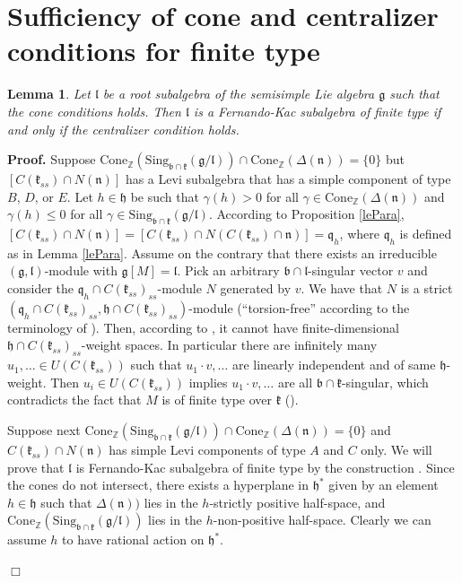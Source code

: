 \documentclass[12pt]{report}
\newtheorem{lemma}[theo]{Lemma}
\newenvironment{proof}[1][]{ \textbf{Proof#1. }}{$\Box$\medskip}
\newcommand {\ZZ} {\mathbb {Z}}
\newcommand{\kk}{\mathfrak{k}}
\newcommand{\nn}{\mathfrak{n}}
\newcommand{\hh}{\mathfrak{h}}
\newcommand{\qq}{\mathfrak{q}}
\newcommand{\pp}{\mathfrak{p}}
\newcommand{\gG}{\mathfrak{g}}
\newcommand{\bb}{\mathfrak{b}}
\newcommand{\lL}{\mathfrak{l}}
\newcommand{\refle}[1]{Lemma \ref{#1}}
\newcommand{\Cone}{\mathrm{Cone}}
\newcommand{\hw}{\mathrm{Sing}}
\begin{document}
\section{Sufficiency of cone and centralizer conditions for finite type}
\begin{lemma}
Let $\lL$ be a root subalgebra of the semisimple Lie algebra $\gG$ such that the cone conditions holds. Then $\lL$ is a Fernando-Kac subalgebra of finite type if and only if the centralizer condition holds.
\end{lemma}
\begin{proof}
Suppose $\Cone_{\ZZ} (\hw_{\bb\cap\kk}(\gG/\lL))\cap \Cone_{\ZZ}(\Delta(\nn))= \{0\}$ but $[C(\kk_{ss})\cap N(\nn)]$ has a Levi subalgebra that has a simple component of type $B$, $D$, or $E$. Let $h\in\hh$ be such that $\gamma(h)>0$ for all $\gamma \in \Cone_{\ZZ}(\Delta(\nn))$ and $\gamma(h)\leq 0$ for all $\gamma\in\hw_{\bb\cap\kk}(\gG/\lL)$. According to Proposition \ref{lePara}, $[C(\kk_{ss}) \cap N(\nn)] =[C(\kk_{ss})\cap N(C(\kk_{ss})\cap\nn)]=\qq_h$, where $\qq_h$ is defined as in \refle{lePara}. Assume on the contrary that there exists an irreducible $(\gG,\lL)$-module with $\gG[M]=\lL$. Pick an arbitrary $\bb\cap\lL$-singular vector $v$ and consider the $\qq_h\cap C(\kk_{ss})_{ss}$-module $N$ generated by $v$. We have that $N$ is a strict $(\qq_h\cap C(\kk_{ss})_{ss}, \hh\cap C(\kk_{ss})_{ss})$-module (``torsion-free'' according to the terminology of \cite{Fernando1}). Then, according to \cite[Theorem 5.2]{Fernando1}, it cannot have finite-dimensional $\hh\cap C(\kk_{ss})_{ss}$-weight spaces. In particular there are infinitely many $u_1,\dots\in U(C(\kk_{ss}))$ such that $u_1\cdot v,\dots$ are linearly independent and of same $\hh$-weight. Then $u_i\in U(C(\kk_{ss}))$ implies $u_1\cdot v,\dots$ are all $\bb\cap\kk$-singular, which contradicts the fact that $M$ is of finite type over $\kk$ (\cite[Theorem 3.1]{PSZ}). 


Suppose next $\Cone_{\ZZ}(\hw_{\bb\cap\kk}(\gG/\lL))\cap \Cone_{\ZZ}(\Delta(\nn))=\{0\}$ and $C(\kk_{ss})\cap N(\nn)$ has simple Levi components of type $A$ and $C$ only.  We will prove that $\lL$ is Fernando-Kac subalgebra of finite type by the construction \cite[Theorem 4.3]{PSZ}. Since the cones do not intersect, there exists a hyperplane in $\hh^*$ given by an element $h\in\hh$ such that $\Delta(\nn))$ lies in the $h$-strictly positive half-space, and $\Cone_{\ZZ}(\hw_{\bb\cap\kk}(\gG/\lL))$ lies in the $h$-non-positive half-space. Clearly we can assume $h$ to have rational action on $\hh^*$.


\end{proof}
\end{document}
